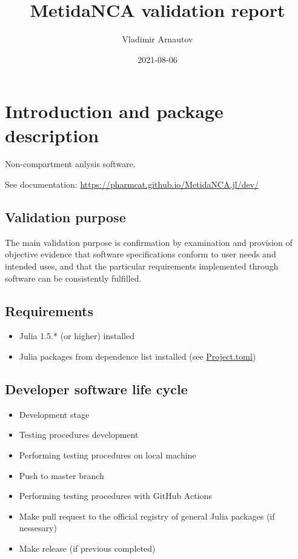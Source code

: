 \documentclass[12pt,a4paper]{article}
\title{ MetidaNCA validation report }
\author{ Vladimir Arnautov }
\date{ 2021-08-06 }
\begin{document}
\maketitle


\section{Introduction and package description}
Non-compartment anlysis software.

See documentation: \href{https://pharmcat.github.io/MetidaNCA.jl/dev/}{https://pharmcat.github.io/MetidaNCA.jl/dev/}

\subsection{Validation purpose}
The main validation purpose is confirmation by examination and provision of objective evidence that software specifications conform to user needs and intended uses, and that the particular requirements implemented through software can be consistently fulfilled.

\subsection{Requirements}
\begin{itemize}
\item Julia 1.5.* (or higher) installed


\item Julia packages from dependence list installed (see \href{https://github.com/PharmCat/MetidaNCA.jl/blob/main/Project.toml}{Project.toml})

\end{itemize}
\subsection{Developer software life cycle}
\begin{itemize}
\item Development stage


\item Testing procedures development


\item Performing testing procedures on local machine


\item Push to master branch


\item Performing testing procedures with GitHub Actions


\item Make pull request to the official registry of general Julia packages (if nessesary)


\item Make release (if previous completed)

\end{itemize}
\end{document}
